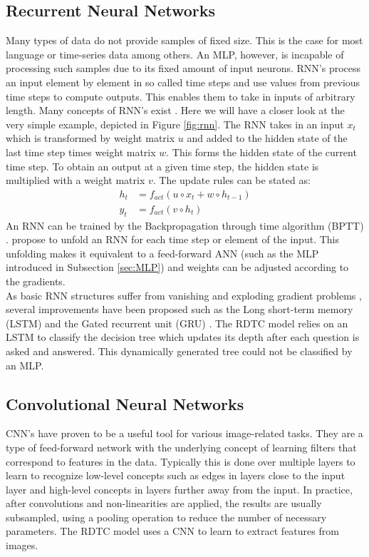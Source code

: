\documentclass[a4paper,cleardoubleempty,BCOR1cm, 11pt]{report}
\begin{document}
\subsection{Recurrent Neural Networks}
Many types of data do not provide samples of fixed size. This is the case for most language or time-series data among others. An MLP, however, is incapable of processing such samples due to its fixed amount of input neurons. RNN's process an input element by element in so called time steps and use values from previous time steps to compute outputs. This enables them to take in inputs of arbitrary length. Many concepts of RNN's exist \cite{Grossberg:2013}. Here we will have a closer look at the very simple example, depicted in Figure \ref{fig:rnn}.
The  RNN takes in an input $x_t$ which is transformed by weight matrix $u$ and added to the hidden state of the last time step times weight matrix $w$. This forms the hidden state of the current time step. To obtain an output at a given time step, the hidden state is multiplied with a weight matrix $v$. The update rules can be stated as:
\begin{align*}
	h_t &= f_{act}(u \circ x_t + w \circ h_{t-1})\\
	y_t &=f_{act}(v \circ h_t)
\end{align*}
An RNN can be trained by the Backpropagation through time algorithm (BPTT) \cite{werbos1990backpropagation}. \citet{werbos1990backpropagation} propose to unfold an RNN for each time step or element of the input. This unfolding makes it equivalent to a feed-forward ANN (such as the MLP introduced in Subsection \ref{sec:MLP}) and weights can be adjusted according to the gradients.\\
As basic RNN structures suffer from vanishing and exploding gradient problems \cite{bengio1994learning}, several improvements have been proposed such as the Long short-term memory (LSTM) \cite{hochreiter1997long} and the Gated recurrent unit (GRU) \cite{cho2014learning}.
The RDTC model relies on an LSTM to classify the decision tree which updates its depth after each question is asked and answered. This dynamically generated tree could not be classified by an MLP.


\subsection{Convolutional Neural Networks}
CNN's have proven to be a useful tool for various image-related tasks. They are a type of feed-forward network with the underlying concept of learning filters that correspond to features in the data. Typically this is done over multiple layers to learn to recognize low-level concepts such as edges in layers close to the input layer and high-level concepts in layers further away from the input. In practice, after convolutions and non-linearities are applied, the results are usually subsampled, using a pooling operation to reduce the number of necessary parameters. The RDTC model uses a CNN to learn to extract features from images.
\end{document}
